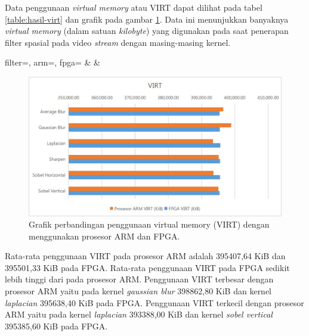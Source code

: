 Data penggunaan \textit{virtual memory} atau VIRT dapat dilihat pada tabel \ref{table:hasil-virt} dan grafik pada gambar \ref{fig:chart-virt}. Data ini menunjukkan banyaknya \textit{virtual memory} (dalam satuan \textit{kilobyte}) yang digunakan pada saat penerapan filter spasial pada video \textit{stream} dengan masing-masing kernel.
\begin{atable}
    \caption{Tabel perbandingan penggunaan virtual memory (VIRT) dengan menggunakan prosesor ARM dan FPGA.}
    \label{table:hasil-virt}
        {
            filter=\filter, 
            arm=\arm, 
            fpga=\fpga}
        {
            \filter & 
            \arm & 
            \fpga }
\end{atable}
\begin{figure}[H]
    \includegraphics[width=0.81\linewidth, center]{images/chart/chart-virt.png}
    \caption{Grafik perbandingan penggunaan virtual memory (VIRT) dengan menggunakan prosesor ARM dan FPGA.}
    \label{fig:chart-virt}
\end{figure}
Rata-rata penggunaan VIRT pada prosesor ARM adalah 395407,64 KiB dan 395501,33 KiB pada FPGA. Rata-rata penggunaan VIRT pada FPGA sedikit lebih tinggi dari pada prosesor ARM. Penggunaan VIRT terbesar dengan prosesor ARM yaitu pada kernel \textit{gaussian blur} 398862,80 KiB dan kernel \textit{laplacian} 395638,40 KiB pada FPGA. Penggunaan VIRT terkecil dengan prosesor ARM yaitu pada kernel \textit{laplacian} 393388,00 KiB dan kernel \textit{sobel vertical} 395385,60 KiB pada FPGA.

